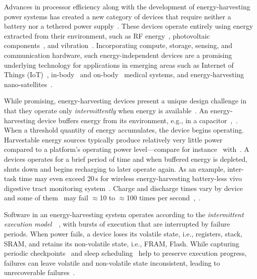Advances in processor efficiency along with the development of energy-harvesting power systems has created a new category of devices that require neither a battery nor a tethered power supply~\cite{prasad_comst_2014,lucia_snapl_2017,soyata_csm_2016}. These devices operate entirely using energy extracted from their environment, such as RF energy~\cite{rf_powered_computing_gollakota_2014}, photovoltaic components~\cite{margolies_infocom_2016,margolies_tosn_2016}, and vibration~\cite{gorlatova_sigmetrics_2014}. Incorporating compute, storage, sensing, and communication hardware, such energy-independent devices are a promising underlying technology for applications in emerging areas such as Internet of Things (IoT)~\cite{ku_cst_2016}, in-body~\cite{nadeau_naturebio_2017} and on-body~\cite{bandodkar_electroanalysis_2015} medical systems, and energy-harvesting nano-satellites~\cite{kicksat}.

While promising, energy-harvesting devices present a unique design challenge in
that they operate only {\em intermittently} when energy is available~\cite{hicks_isca_2017,lucia_snapl_2017}. An
energy-harvesting device buffers energy from its environment, e.g., in a
capacitor~\cite[Fig. 3]{gorlatova_tmc_2013},~\cite[Fig. 1]{gunduz_commag_2014}. When a threshold quantity of energy accumulates, the device begins operating. Harvestable energy sources typically produce relatively very little power compared to a platform's operating power level---compare for instance~\cite[Table III and V]{prasad_comst_2014} with~\cite[Table I]{carrano_cst_2014}. A devices operates for a brief period of time and when buffered energy is depleted, shuts down and begins recharging to later operate again. As an example, inter-task time may even exceed 20\,s for wireless energy-harvesting battery-less vivo digestive tract monitoring system~\cite[Fig. 3c]{nadeau_naturebio_2017}. Charge and discharge times vary by device and some of them~\cite{wisp} may fail $\approx$10 to $\approx$100 times per second~\cite[Fig. 1]{tan_infocom_2016},~\cite[Fig. 1]{mementos}.


Software in an energy-harvesting system operates according to the {\em
intermittent execution model}~\cite[Sec. 2]{dino}~\cite[Fig. 2]{lucia_snapl_2017}, with bursts of execution that are interrupted by failure periods. When power fails, a device loses its volatile state, i.e., registers, stack, SRAM, and retains its non-volatile state, i.e., FRAM, Flash. While capturing periodic checkpoints~\cite{mementos,quickrecall} and sleep scheduling~\cite{dewdrop,hibernus,hibernusplusplus} help to preserve execution progress, failures can leave volatile and non-volatile state inconsistent, leading to unrecoverable failures~\cite{mspcdino,edb}. 

